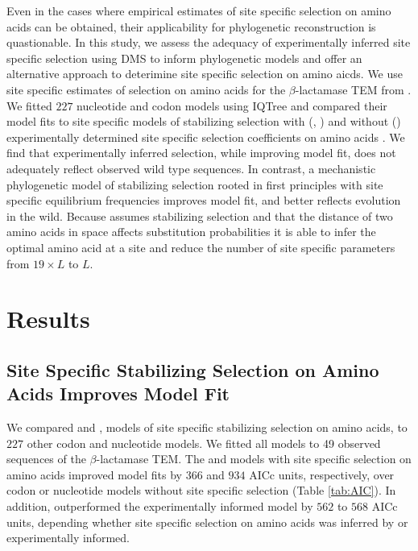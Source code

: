 Even in the cases where empirical estimates of site specific selection on amino acids can be obtained, their applicability for phylogenetic reconstruction is quastionable.
In this study, we assess the adequacy of experimentally inferred site specific selection using DMS to inform phylogenetic models and offer an alternative approach to deterimine site specific selection on amino aicds.
We use site specific estimates of selection on amino acids for the $\beta$-lactamase TEM from \citet{stiffler2016}.
We fitted $227$ nucleotide and codon models using IQTree and compared their model fits to site specific models of stabilizing selection with (\phydms, \selacDMS) and without (\selac) experimentally determined site specific selection coefficients on amino acids \citep{nguyen2015,hilton2017,beaulieu2018}.
We find that experimentally inferred selection, while improving model fit, does not adequately reflect observed wild type sequences.
In contrast, \selac \citep{beaulieu2018} a mechanistic phylogenetic model of stabilizing selection rooted in first principles with site specific equilibrium frequencies improves model fit, and better reflects evolution in the wild.
Because \selac assumes stabilizing selection and that the distance of two amino acids in \PC space affects substitution probabilities it is able to infer the optimal amino acid at a site and reduce the number of site specific parameters from $19\times L$ to $L$.

\section{Results}

\subsection{Site Specific Stabilizing Selection on Amino Acids Improves Model Fit}
We compared \phydms \citep{hilton2017} and \selac \citep{beaulieu2018}, models of site specific stabilizing selection on amino acids, to $227$ other codon and nucleotide models.
We fitted all models to 49 observed sequences of the $\beta$-lactamase TEM.
The \phydms and \selac models with site specific selection on amino acids improved model fits by $366$ and $934$ AICc units, respectively, over codon or nucleotide models without site specific selection (Table \ref{tab:AIC}).
In addition, \selac outperformed the experimentally informed model \phydms by $562$ to $568$ AICc units, depending whether site specific selection on amino acids was inferred by \selac or experimentally informed.

